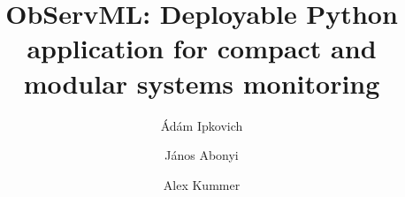\documentclass[preprint,12pt, a4paper]{elsarticle}
\begin{document}
\renewcommand{\labelenumii}{\arabic{enumi}.\arabic{enumii}}

\begin{frontmatter}


\title{ObServML: Deployable Python application for compact and modular systems monitoring}


\author[1]{Ádám Ipkovich}
\author[1]{János Abonyi}
\author[1]{Alex Kummer}
\address[1]{, , }


\end{frontmatter}
\end{document}
